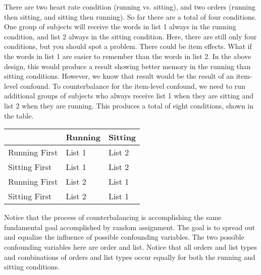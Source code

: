 There are two heart rate condition (running vs. sitting), and two orders (running then sitting, and sitting then running). So far there are a total of four conditions. One group of subjects will receive the words in list 1 always in the running condition, and list 2 always in the sitting condition. Here, there are still only four conditions, but you should spot a problem. There could be item effects. What if the words in list 1 are easier to remember than the words in list 2. In the above design, this would produce a result showing better memory in the running than sitting conditions. However, we know that result would be the result of an item-level confound. To counterbalance for the item-level confound, we need to run additional groups of subjects who always receive list 1 when they are sitting and list 2 when they are running. This produces a total of eight conditions, shown in the table.

\begin{table}[]
\centering
\label{my-label}
\begin{tabular}{lll}
\hline
              & Running & Sitting \\ \hline
Running First & List 1  & List 2  \\ \cline{1-1}
Sitting First & List 1  & List 2  \\ \cline{1-1}
Running First & List 2  & List 1  \\ \cline{1-1}
Sitting First & List 2  & List 1  \\ \cline{1-1}
\end{tabular}
\end{table}

Notice that the process of counterbalancing is accomplishing the same fundamental goal accomplished by random assignment. The goal is to spread out and equalize the influence of possible confounding variables. The two possible confounding variables here are order and list. Notice that all orders and list types and combinations of orders and list types occur equally for both the running and sitting conditions. 


